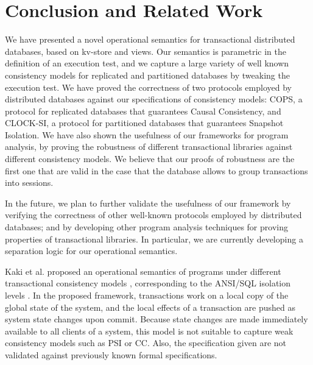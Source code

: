 \section{Conclusion and Related Work}
We have presented a novel operational semantics for 
transactional distributed databases, based on kv-store and views. 
Our semantics is parametric in the definition of an execution test, 
and we capture a large variety of well known consistency models 
for replicated and partitioned databases by tweaking the execution test. 
We have proved the correctness of two protocols employed by distributed 
databases against our specifications of consistency models: COPS, a 
protocol for replicated databases that guarantees Causal Consistency, 
and CLOCK-SI, a protocol for partitioned databases that guarantees 
Snapshot Isolation. We have also shown the usefulness of our frameworks 
for program analysis, by proving the robustness of different transactional 
libraries against different consistency models. We believe that our proofs of 
robustness are the first one that are valid in the case that the database allows 
to group transactions into sessions. 

In the future, we plan to further validate the usefulness of our framework by 
verifying the correctness of other well-known protocols employed by 
distributed databases; and by developing other program analysis techniques 
for proving properties of transactional libraries. In particular, we are currently 
developing a separation logic for our operational semantics.

Kaki et al. proposed an operational semantics of programs 
under different transactional consistency models \cite{alonetogether}, 
corresponding to the ANSI/SQL isolation levels \cite{si}.
In the proposed framework, transactions work on a local copy of the global state 
of the system, and the local effects of a transaction are pushed as 
system state changes upon commit. Because state changes 
are made immediately available to all clients of a system, this model 
is not suitable to capture weak consistency models such as PSI or CC. 
Also, the specification given are not validated against previously known 
formal specifications.

